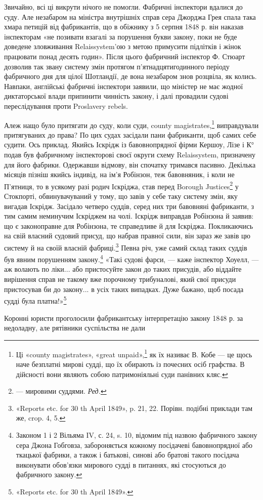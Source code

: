 Звичайно, всі ці викрути нічого не помогли. Фабричні інспектори
вдалися до суду. Але незабаром на міністра внутрішніх
справ сера Джорджа Грея спала така хмара петицій від фабрикантів,
що в обіжнику з 5 серпня 1848 р. він наказав інспекторам
«не позивати взагалі за порушення букви закону, поки не буде
доведене зловживання Relaissystem’ою з метою примусити підлітків
і жінок працювати понад десять годин». Після цього фабричний
інспектор Ф. Стюарт дозволив так звану систему змін протягом
п’ятнадцятигодинного періоду фабричного дня для цілої Шотландії,
де вона незабаром знов розцвіла, як колись. Навпаки,
англійські фабричні інспектори заявили, що міністер не має
жодної диктаторської влади припинити чинність закону, і далі
провадили судові переслідування проти Proslavery rebels.

Алеж нащо було притягати до суду, коли суди, county magistrates,\footnote{
Ці «county magistrates», «great unpaid»,\footnote*{
— величні неоплачувані. \emph{Ред.}
} як їх називає В. Кобе
— це щось наче безплатні мирові судді, що їх обирають із почесних
осіб графства. В дійсності вони являють собою патримоніяльні суди панівних
кляс.
}
виправдували притягуваних до права? По цих судах
засідали пани фабриканти, щоб самих себе судити. Ось приклад.
Якийсь Іскрідж із бавовнопрядної фірми Кершоу, Лізе і К°
подав був фабричному інспекторові своєї округи схему Relaissystem,
призначену для його фабрики. Одержавши відмову,
він спочатку тримався пасивно. Декілька місяців пізніш якийсь
індивід, на ім’я Робінзон, теж бавовняник, і коли не П’ятниця,
то в усякому разі родич Іскріджа, став перед Borough Justices\footnote*{
— мировими суддями. \emph{Ред.}
}
у Стокпорті, обвинувачуваний у тому, що завів у себе таку
систему змін, яку вигадав Іскрідж. Засідало четверо суддів,
серед них три бавовняні фабриканти, з тим самим неминучим
Іскріджем на чолі. Іскрідж виправдав Робінзона й заявив: що є
законоправне для Робінзона, те справедливе й для Іскріджа.
Покликаючись на свій власний судовий присуд, що набрав правної
сили, він зараз же завів цю систему й на своїй власній фабриці.\footnote{
«Reports etc. for 30 th April 1849», p. 21, 22. Порівн. подібні
приклади там же, crop. 4, 5.
}
Певна річ, уже самий склад таких суддів був явним порушенням
закону.\footnote{
Законом 1 і 2 Вільяма IV, с. 24, s. 10, відомим під назвою фабричного
закону сера Джона Гобговза, забороняється кожному посідачеві
бавовнопрядної або ткацької фабрики, а також і батькові, синові або
братові такого посідача виконувати обов'язки мирового судді в питаннях,
які стосуються до фабричного закону.
} «Такі судові фарси, — каже інспектор Хоуелл, —
аж волають по ліки... або пристосуйте закон до таких присудів,
або віддайте вирішення справ не такому вже порочному трибуналові,
який свої присуди пристосував би до закону... в усіх таких
випадках. Дуже бажано, щоб посада судді була платна!»\footnote{
«Reports etc. for 30 th April 1849».
}

Коронні юристи проголосили фабрикантську інтерпретацію
закону 1848 р. за недоладну, але рятівники суспільства не дали